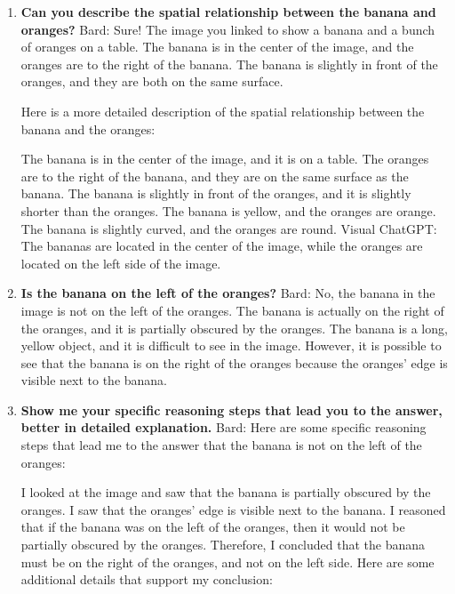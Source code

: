     \begin{enumerate}
        \item \textbf{Can you describe the spatial relationship between the banana and oranges?}
        \subitem 
        Bard: Sure! The image you linked to show a banana and a bunch of oranges on a table. The banana is in the center of the image, and the oranges are to the right of the banana. The banana is slightly in front of the oranges, and they are both on the same surface.
        
        Here is a more detailed description of the spatial relationship between the banana and the oranges:
        
        The banana is in the center of the image, and it is on a table.
        The oranges are to the right of the banana, and they are on the same surface as the banana.
        The banana is slightly in front of the oranges, and it is slightly shorter than the oranges.
        The banana is yellow, and the oranges are orange.
        The banana is slightly curved, and the oranges are round.
        \subitem Visual ChatGPT: The bananas are located in the center of the image, while the oranges are located on the left side of the image.
        \item \textbf{Is the banana on the left of the oranges?}
        \subitem Bard: 
        No, the banana in the image is not on the left of the oranges. The banana is actually on the right of the oranges, and it is partially obscured by the oranges. The banana is a long, yellow object, and it is difficult to see in the image. However, it is possible to see that the banana is on the right of the oranges because the oranges' edge is visible next to the banana.
        \item \textbf{Show me your specific reasoning steps that lead you to the answer, better in detailed explanation.}
        \subitem Bard: Here are some specific reasoning steps that lead me to the answer that the banana is not on the left of the oranges:

        I looked at the image and saw that the banana is partially obscured by the oranges.
        I saw that the oranges' edge is visible next to the banana.
        I reasoned that if the banana was on the left of the oranges, then it would not be partially obscured by the oranges.
        Therefore, I concluded that the banana must be on the right of the oranges, and not on the left side.
        Here are some additional details that support my conclusion:
        

\end{enumerate}
